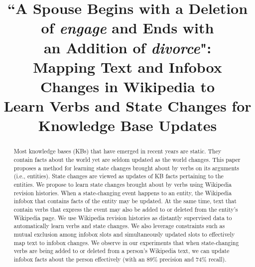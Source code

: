 \documentclass[11pt,a4paper]{article}
\title{``A Spouse Begins with a Deletion of \textit{engage} and Ends with \\an Addition of \textit{divorce}": \\Mapping Text and Infobox Changes in Wikipedia to \\Learn Verbs and State Changes for Knowledge Base Updates}
\author{%
  }
\date{}
\begin{document}
\maketitle


\begin{abstract}
Most knowledge bases (KBs) that have emerged in recent years are static. They contain facts about the world yet are seldom updated as the world changes. This paper proposes a method for learning state changes brought about by verbs on its arguments (i.e., entities). State changes are viewed as updates of KB facts pertaining to the entities. We propose to learn state changes brought about by verbs using Wikipedia revision histories. When a state-changing event happens to an entity, the Wikipedia infobox that contains facts of the entity may be updated. At the same time, text that contain verbs that express the event may also be added to or deleted from the entity's Wikipedia page. We use Wikipedia revision histories as distantly supervised data to automatically learn verbs and state changes. We also leverage %
constraints such as mutual exclusion among infobox slots and simultaneously updated slots to effectively map text to infobox changes. We observe in our experiments that when state-changing verbs are being added to or deleted from a person's Wikipedia text, we can update infobox facts about the person effectively (with an 89\% precision and 74\% recall). 

\end{abstract}








\end{document}
